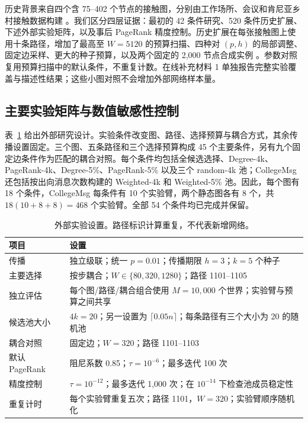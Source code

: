 \documentclass[smallextended]{svjour3}
\begin{document}
历史背景来自四个含 75--402 个节点的接触图，分别由工作场所、会议和肯尼亚乡村接触数据构建 \cite{ref3,ref4,ref5,ref6}。我们区分四层证据：最初的 42 条件研究、520 条件历史扩展、下述外部实验矩阵，以及事后 PageRank 精度控制。历史扩展在每张接触图上使用十条路径，增加了最高至 $W=5120$ 的预算扫描、四种对 $(p,h)$ 的局部调整、固定边采样、更大的种子预算，以及两个固定的 2,000 节点合成实例 \cite{ref17,ref18}。参数对照复用预算扫描中的默认条件，不重复计数。在线补充材料 1 单独报告完整实验覆盖与描述性结果；这些小图对照不会增加外部网络样本量。

\subsection{主要实验矩阵与数值敏感性控制}
表~\ref{tab:settings} 给出外部研究设计。实验条件改变图、路径、选择预算与耦合方式，其余传播设置固定。三个图、五条路径和三个选择预算构成 45 个主要条件，另有九个固定边条件作为匹配的耦合对照。每个条件均包括全候选选择、Degree-4k、PageRank-4k、Degree-5\%、PageRank-5\% 以及三个 random-4k 池；CollegeMsg 还包括按出向消息次数构建的 Weighted-4k 和 Weighted-5\% 池。因此，每个图有 18 个条件，CollegeMsg 每条件有 10 个实验臂，两个静态图各有 8 个，共 $18(10+8+8)=468$ 个实验臂。全部 54 个条件均已完成并保留。

\begin{table}[htbp]
\caption{外部实验设置。路径标识计算重复，不代表新增网络。}\label{tab:settings}
\begin{tabularx}{\linewidth}{lX}
\toprule
项目 & 设置 \\
\midrule
传播 & 独立级联；统一 $p=0.01$；传播期限 $h=3$；$k=5$ 个种子 \\
主要选择 & 按步耦合；$W\in\{80,320,1280\}$；路径 1101--1105 \\
独立评估 & 每个图/路径/耦合组合使用 $M=10,000$ 个世界；实验臂与预算之间共享 \\
候选池大小 & $4k=20$；另一设置为 $\lceil0.05n\rceil$；每条路径有三个大小为 20 的随机池 \\
耦合对照 & 固定边；$W=320$；路径 1101--1103 \\
默认 PageRank & 阻尼系数 0.85；$\tau=10^{-6}$；最多迭代 100 次 \\
精度控制 & $\tau=10^{-12}$；最多迭代 1,000 次；在 $10^{-14}$ 下检查池成员稳定性 \\
重复计时 & 每个实验臂重复五次；路径 1101，$W=320$；实验臂顺序随机化 \\
\bottomrule
\end{tabularx}
\end{table}
\end{document}

